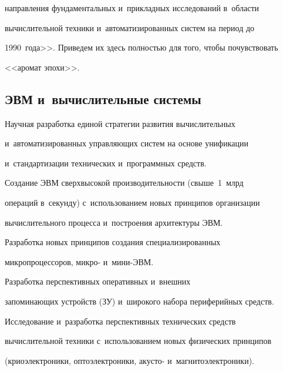 на\-прав\-ле\-ния фундаментальных и~при\-клад\-ных исследований в~об\-ласти 

вы\-чис\-ли\-тель\-ной техники и~автоматизированных сис\-тем на период до 

1990~года>>. Приведем их здесь пол\-ностью для того, чтобы почувствовать 

<<аромат эпохи>>.



\vspace*{-3pt}



\subsection*{ЭВМ и~вычислительные системы}



\vspace*{-3pt}



     Научная разработка единой стратегии развития вы\-чис\-ли\-тель\-ных 

и~автоматизированных управ\-ля\-ющих сис\-тем на основе унификации 

и~стандартизации технических и~программных средств.

     

     Создание ЭВМ сверхвысокой производительности (свыше~1~млрд 

операций в~секунду) с~использованием новых принципов организации 

вы\-чис\-ли\-тель\-но\-го процесса и~по\-стро\-ения архитектуры ЭВМ.

     

     Разработка новых принципов создания специализированных 

мик\-ро\-про\-цес\-со\-ров, микро- и~ми\-ни-ЭВМ.

     

     Разработка перспективных оперативных и~внеш\-них  

за\-по\-ми\-на\-ющих устройств (ЗУ) и~широкого набора периферийных средств.

     

     Исследование и~разработка перспективных технических средств 

вычислительной техники с~использованием новых физических принципов 

(криоэлектроники, оптоэлектроники, акусто- и~маг\-ни\-то\-элект\-ро\-ни\-ки).

     

